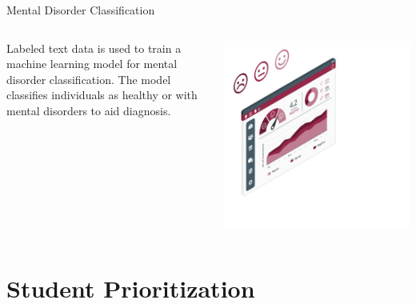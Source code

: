 \documentclass[10pt, xcolor=table]{beamer}
\begin{document}
\begin{frame}{Mental Disorder Classification}
	
	\begin{columns}[c]
		\justifying

		\vspace{0.3cm}
		Labeled text data is used to train a machine learning model for mental disorder classification. The model classifies individuals as healthy or with mental disorders to aid diagnosis.
		
		\centering
		\vspace{-0.3cm}
		\includegraphics[width=\linewidth]{./figures/sentimental_analysis.png} %
	\end{columns}
	
\end{frame}


\section*{Student Prioritization}
\end{document}
